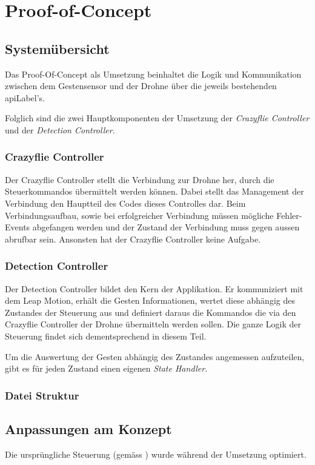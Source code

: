 \chapter{Proof-of-Concept}

\section{Systemübersicht}
Das Proof-Of-Concept als Umsetzung beinhaltet die Logik und Kommunikation zwischen dem Gestensensor und der Drohne über die jeweils bestehenden \gls{apiLabel}'s.

Folglich sind die zwei Hauptkomponenten der Umsetzung der \textit{Crazyflie Controller} und der \textit{Detection Controller}.

\subsection{Crazyflie Controller}
Der Crazyflie Controller stellt die Verbindung zur Drohne her, durch die Steuerkommandos übermittelt werden können.
Dabei stellt das Management der Verbindung den Hauptteil des Codes dieses Controlles dar.
Beim Verbindungsaufbau, sowie bei erfolgreicher Verbindung müssen mögliche Fehler-Events abgefangen werden und der Zustand der Verbindung muss gegen aussen abrufbar sein.
Ansonsten hat der Crazyflie Controller keine Aufgabe.

\subsection{Detection Controller}
Der Detection Controller bildet den Kern der Applikation. Er kommuniziert mit dem Leap Motion, erhält die Gesten Informationen, wertet diese abhängig des Zustandes der Steuerung aus und definiert daraus die Kommandos die via den Crazyflie Controller der Drohne übermitteln werden sollen.
Die ganze Logik der Steuerung findet sich dementsprechend in diesem Teil.

Um die Auswertung der Gesten abhängig des Zustandes angemessen aufzuteilen, gibt es für jeden Zustand einen eigenen \textit{State Handler}.

\subsection{Datei Struktur}

\section{Anpassungen am Konzept}
\label{sec:poc:conceptChanges}
Die ursprüngliche Steuerung (gemäss ) wurde während der Umsetzung optimiert.

